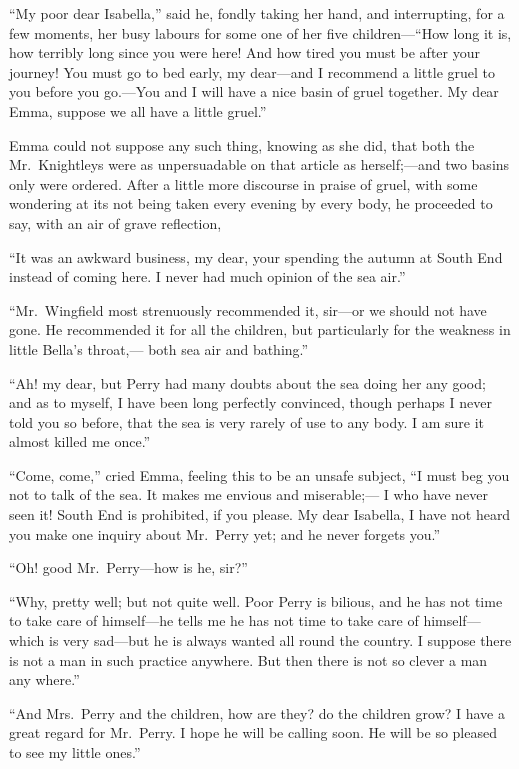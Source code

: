 ``My poor dear Isabella,'' said he, fondly taking her hand,
and interrupting, for a few moments, her busy labours for some one
of her five children---``How long it is, how terribly long since you
were here!  And how tired you must be after your journey!  You must
go to bed early, my dear---and I recommend a little gruel to you
before you go.---You and I will have a nice basin of gruel together.
My dear Emma, suppose we all have a little gruel.''

Emma could not suppose any such thing, knowing as she did,
that both the Mr.\ Knightleys were as unpersuadable on that article
as herself;---and two basins only were ordered.  After a little
more discourse in praise of gruel, with some wondering at its
not being taken every evening by every body, he proceeded to say,
with an air of grave reflection,

``It was an awkward business, my dear, your spending the autumn
at South End instead of coming here.  I never had much opinion
of the sea air.''

``Mr.\ Wingfield most strenuously recommended it, sir---or we
should not have gone.  He recommended it for all the children,
but particularly for the weakness in little Bella's throat,---%
both sea air and bathing.''

``Ah! my dear, but Perry had many doubts about the sea doing her
any good; and as to myself, I have been long perfectly convinced,
though perhaps I never told you so before, that the sea is very
rarely of use to any body.  I am sure it almost killed me once.''

``Come, come,'' cried Emma, feeling this to be an unsafe subject, ``I must
beg you not to talk of the sea.  It makes me envious and miserable;---%
I who have never seen it!  South End is prohibited, if you please.
My dear Isabella, I have not heard you make one inquiry about
Mr.\ Perry yet; and he never forgets you.''

``Oh! good Mr.\ Perry---how is he, sir?''

``Why, pretty well; but not quite well.  Poor Perry is bilious,
and he has not time to take care of himself---he tells me he has
not time to take care of himself---which is very sad---but he is
always wanted all round the country.  I suppose there is not a man
in such practice anywhere.  But then there is not so clever a man
any where.''

``And Mrs.\ Perry and the children, how are they? do the children grow?
I have a great regard for Mr.\ Perry.  I hope he will be calling soon.
He will be so pleased to see my little ones.''


